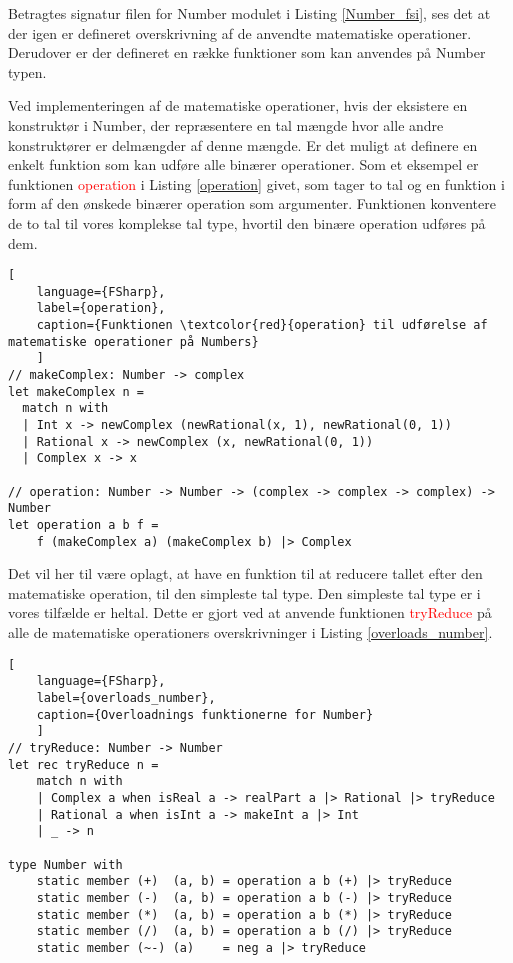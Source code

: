 Betragtes signatur filen for Number modulet i Listing \ref{Number_fsi}, ses det at der igen er defineret overskrivning af de anvendte matematiske operationer. Derudover er der defineret en række funktioner som kan anvendes på Number typen. 



Ved implementeringen af de matematiske operationer, hvis der eksistere en konstruktør i Number, der repræsentere en tal mængde hvor alle andre konstruktører er delmængder af denne mængde. Er det muligt at definere en enkelt funktion som kan udføre alle binærer operationer. Som et eksempel er funktionen \textcolor{red}{operation} i Listing \ref{operation} givet, som tager to tal og en funktion i form af den ønskede binærer operation som argumenter. Funktionen konventere de to tal til vores komplekse tal type, hvortil den binære operation udføres på dem. 

\begin{lstlisting}[
    language={FSharp},
    label={operation}, 
    caption={Funktionen \textcolor{red}{operation} til udførelse af matematiske operationer på Numbers}
    ]
// makeComplex: Number -> complex
let makeComplex n =
  match n with
  | Int x -> newComplex (newRational(x, 1), newRational(0, 1))
  | Rational x -> newComplex (x, newRational(0, 1))
  | Complex x -> x

// operation: Number -> Number -> (complex -> complex -> complex) -> Number
let operation a b f =
    f (makeComplex a) (makeComplex b) |> Complex

\end{lstlisting}

Det vil her til være oplagt, at have en funktion til at reducere tallet efter den matematiske operation, til den simpleste tal type. Den simpleste tal type er i vores tilfælde er heltal. Dette er gjort ved at anvende funktionen \textcolor{red}{tryReduce} på alle de matematiske operationers overskrivninger i Listing \ref{overloads_number}. 

\begin{lstlisting}[
    language={FSharp},
    label={overloads_number}, 
    caption={Overloadnings funktionerne for Number}
    ]
// tryReduce: Number -> Number
let rec tryReduce n =
    match n with
    | Complex a when isReal a -> realPart a |> Rational |> tryReduce
    | Rational a when isInt a -> makeInt a |> Int
    | _ -> n
 
type Number with
    static member (+)  (a, b) = operation a b (+) |> tryReduce
    static member (-)  (a, b) = operation a b (-) |> tryReduce
    static member (*)  (a, b) = operation a b (*) |> tryReduce
    static member (/)  (a, b) = operation a b (/) |> tryReduce
    static member (~-) (a)    = neg a |> tryReduce
\end{lstlisting}

